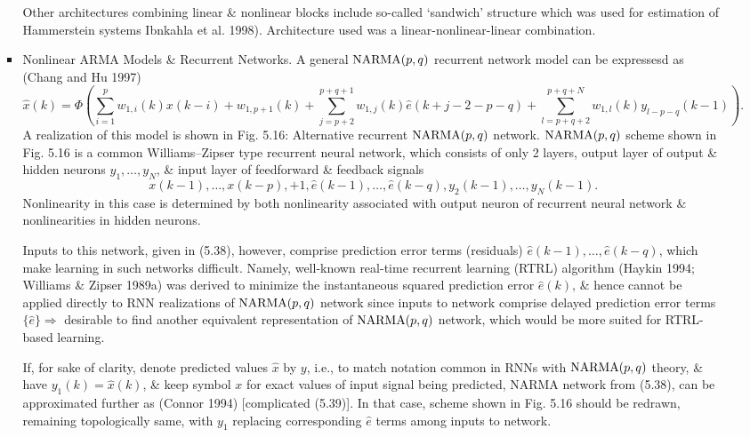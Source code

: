 \documentclass{article}
\begin{document}
\begin{enumerate}
\begin{itemize}
\begin{itemize}
			Other architectures combining linear \& nonlinear blocks include so-called `sandwich' structure which was used for estimation of Hammerstein systems Ibnkahla et al. 1998). Architecture used was a linear-nonlinear-linear combination.
			\item {\sf Nonlinear ARMA Models \& Recurrent Networks.} A general ${\rm NARMA}(p,q)$ recurrent network model can be expressesd as (Chang and
			Hu 1997)
			\begin{equation}
				\hat{x}(k) = \Phi\left(\sum_{i=1}^p w_{1,i}(k)x(k - i) + w_{1,p+1}(k) + \sum_{j = p + 2}^{p + q + 1} w_{1,j}(k)\hat{e}(k + j - 2 - p - q) + \sum_{l = p + q + 2}^{p + q + N} w_{1,l}(k)y_{l - p - q}(k - 1)\right).
			\end{equation}
			A realization of this model is shown in {\sf Fig. 5.16: Alternative recurrent ${\rm NARMA}(p,q)$ network}. ${\rm NARMA}(p,q)$ scheme shown in Fig. 5.16 is a common Williams--Zipser type recurrent neural network, which consists of only 2 layers, output layer of output \& hidden neurons $y_1,\ldots,y_N$, \& input layer of feedforward \& feedback signals
			\begin{equation}
				x(k - 1),\ldots,x(k - p),+1,\hat{e}(k - 1),\ldots,\hat{e}(k - q),y_2(k - 1),\ldots,y_N(k - 1).
			\end{equation}
			Nonlinearity in this case is determined by both nonlinearity associated with output neuron of recurrent neural network \& nonlinearities in hidden neurons.
			
			Inputs to this network, given in (5.38), however, comprise prediction error terms (residuals) $\hat{e}(k - 1),\ldots,\hat{e}(k - q)$, which make learning in such networks difficult. Namely, well-known real-time recurrent learning (RTRL) algorithm (Haykin 1994; Williams \& Zipser 1989a) was derived to minimize the instantaneous squared prediction error $\hat{e}(k)$, \& hence cannot be applied directly to RNN realizations of ${\rm NARMA}(p,q)$ network since inputs to network comprise delayed prediction error terms $\{\hat{e}\}\Rightarrow$ desirable to find another equivalent representation of ${\rm NARMA}(p,q)$ network, which would be more suited for RTRL-based learning.
			
			If, for sake of clarity, denote predicted values $\hat{x}$ by $y$, i.e., to match notation common in RNNs with ${\rm NARMA}(p,q)$ theory, \& have $y_1(k) = \hat{x}(k)$, \& keep symbol $x$ for exact values of input signal being predicted, NARMA network from (5.38), can be approximated further as (Connor 1994) [complicated (5.39)]. In that case, scheme shown in Fig. 5.16 should be redrawn, remaining topologically same, with $y_1$ replacing corresponding $\hat{e}$ terms among inputs to network.
			

\end{itemize}
\end{itemize}
\end{enumerate}
\end{document}
